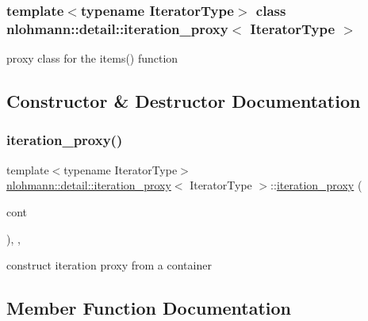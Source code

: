 \subsubsection*{template$<$typename Iterator\+Type$>$\newline
class nlohmann\+::detail\+::iteration\+\_\+proxy$<$ Iterator\+Type $>$}

proxy class for the items() function 

\subsection{Constructor \& Destructor Documentation}
\mbox{\label{classnlohmann_1_1detail_1_1iteration__proxy_afe257e972e3b4658ef2e355f7389d4a5}} 
\subsubsection{\texorpdfstring{iteration\+\_\+proxy()}{iteration\_proxy()}}
{\footnotesize\ttfamily template$<$typename Iterator\+Type$>$ \\
\hyperlink{classnlohmann_1_1detail_1_1iteration__proxy}{nlohmann\+::detail\+::iteration\+\_\+proxy}$<$ Iterator\+Type $>$\+::\hyperlink{classnlohmann_1_1detail_1_1iteration__proxy}{iteration\+\_\+proxy} (\begin{DoxyParamCaption}\item[{typename Iterator\+Type\+::reference}]{cont }\end{DoxyParamCaption})\hspace{0.3cm}{\ttfamily [inline]}, {\ttfamily [explicit]}, {\ttfamily [noexcept]}}



construct iteration proxy from a container 



\subsection{Member Function Documentation}
\mbox{\label{classnlohmann_1_1detail_1_1iteration__proxy_a379f86709d340c4ab1995539b8af623d}} 

